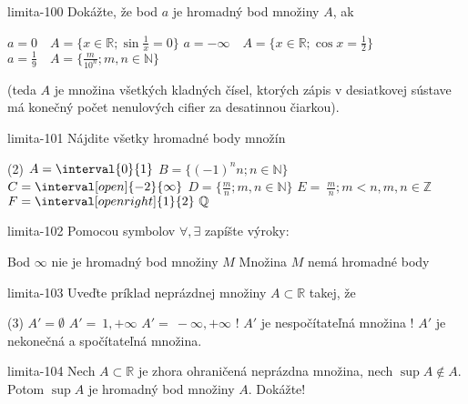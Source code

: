\begin{defproblem}{limita-100}
Dokážte, že bod $a$ je hromadný bod množiny $A$, ak
\begin{tasks}
    \task $a=0 \quad A=\{x \in \mathbb{R}; \sin{\frac{1}{x}} = 0 \}$
    \task $a=-\infty \quad A=\{x \in \mathbb{R}; \cos{x} = \frac{1}{2} \}$
    \task $a=\frac{1}{9} \quad A=\{\frac{m}{10^n}; m,n \in \mathbb{N} \}$
\end{tasks}
(teda $A$ je množina všetkých kladných čísel, ktorých zápis v desiatkovej
sústave má konečný počet nenulových cifier za desatinnou čiarkou).
\end{defproblem}

\begin{defproblem}{limita-101}
Nájdite všetky hromadné body množín
\begin{tasks}(2)
\task $A= \interval{0}{1}$
\task $B= \{ (-1)^n n; n\in \mathbb{N} \} $
\task $C= \interval[open]{-2}{\infty}$
\task $D= \{\frac{m}{n}; m,n \in \mathbb{N} \}$
\task $E= {\ \frac{m}{n}; m<n,m,n \in \mathbb{Z}}$
\task $F= \interval[open right]{1}{2} \ \mathbb{Q}$
\end{tasks}
\end{defproblem}

\begin{defproblem}{limita-102}
Pomocou symbolov $\forall,\exists$ zapíšte výroky:
\begin{tasks}
\task Bod $\infty$ nie je hromadný bod množiny $M$
\task Množina $M$ nemá hromadné body
\end{tasks}
\end{defproblem}

\begin{defproblem}{limita-103}
Uveďte príklad neprázdnej množiny $A \subset \mathbb{R}$ takej, že
\begin{tasks}(3)
\task $A'=\emptyset$
\task $A'={\ 1, +\infty}$
\task $A'={\ -\infty,+\infty}$
\task! $A'$ je nespočítateľná množina
\task! $A'$ je nekonečná a spočítateľná množina.
\end{tasks}
\end{defproblem}

\begin{defproblem}{limita-104}
Nech $A \subset \mathbb{R}$ je zhora ohraničená neprázdna množina, nech $\sup A
\notin A$. Potom $\sup A$ je hromadný bod množiny $A$. Dokážte!
\end{defproblem}

